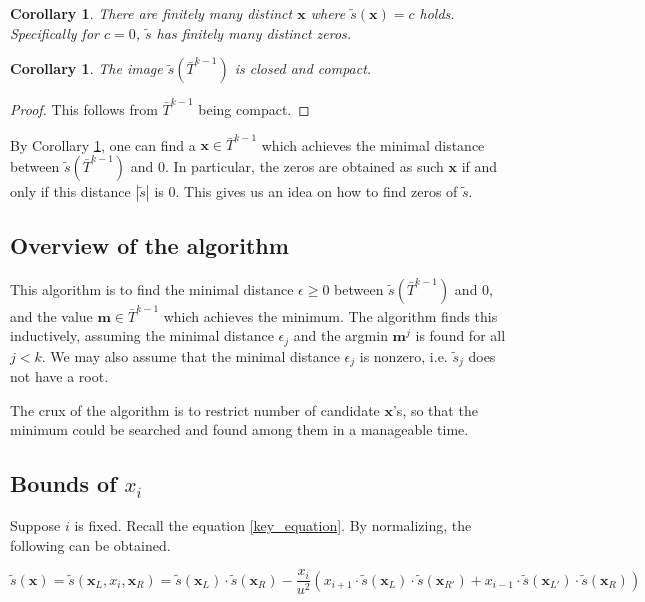 \documentclass{article}
\theoremstyle{definition}
\theoremstyle{plain}
\newtheorem{corollary}[theorem]{Corollary}
\theoremstyle{remark}
\numberwithin{equation}{section}
\newcommand{\abs}[1]{\left\lvert{#1}\right\rvert}
\begin{document}
\begin{corollary}
  There are finitely many distinct $\mathbf{x}$ where $\tilde{s}(\mathbf{x}) = c$ holds.
  Specifically for $c = 0$, $\tilde{s}$ has finitely many distinct zeros.
\end{corollary}

\begin{corollary}\label{image_compact}
  The image $\tilde{s}(\bar{T}^{k-1})$ is closed and compact.
\end{corollary}
\begin{proof}
  This follows from $\bar{T}^{k-1}$ being compact.
\end{proof}

By Corollary \ref{image_compact}, one can find a $\mathbf{x} \in \bar{T}^{k-1}$
which achieves the minimal distance between $\tilde{s}(\bar{T}^{k-1})$ and $0$.
In particular, the zeros are obtained as such $\mathbf{x}$ if and only if this distance $\abs{\tilde{s}}$ is $0$.
This gives us an idea on how to find zeros of $\tilde{s}$.

\subsection{Overview of the algorithm}

This algorithm is to find the minimal distance $\epsilon \geq 0$ between $\tilde{s}(\bar{T}^{k-1})$ and $0$,
and the value $\mathbf{m} \in \bar{T}^{k-1}$ which achieves the minimum.
The algorithm finds this inductively,
assuming the minimal distance $\epsilon_j$ and the argmin $\mathbf{m}^j$ is found for all $j < k$.
We may also assume that the minimal distance $\epsilon_j$ is nonzero,
i.e. $\tilde{s}_j$ does not have a root.

The crux of the algorithm is to restrict number of candidate $\mathbf{x}$'s,
so that the minimum could be searched and found among them in a manageable time.

\subsection{Bounds of $x_i$}

\def\xs {\mathbf{x}}
\def\xsL {\mathbf{x}_L}
\def\xsR {\mathbf{x}_R}
\def\xsLl {\mathbf{x}_{L'}}
\def\xsRr {\mathbf{x}_{R'}}

Suppose $i$ is fixed.
Recall the equation \eqref{key_equation}.
By normalizing, the following can be obtained.

\[
  \tilde{s}(\xs) = \tilde{s}(\xsL, x_i, \xsR)
  = \tilde{s}(\xsL) \cdot \tilde{s}(\xsR)
  - \frac{x_i}{u^2}
  (x_{i+1} \cdot \tilde{s}(\xsL) \cdot \tilde{s}(\xsRr) + x_{i-1} \cdot \tilde{s}(\xsLl) \cdot \tilde{s}(\xsR))
\]
\end{document}
